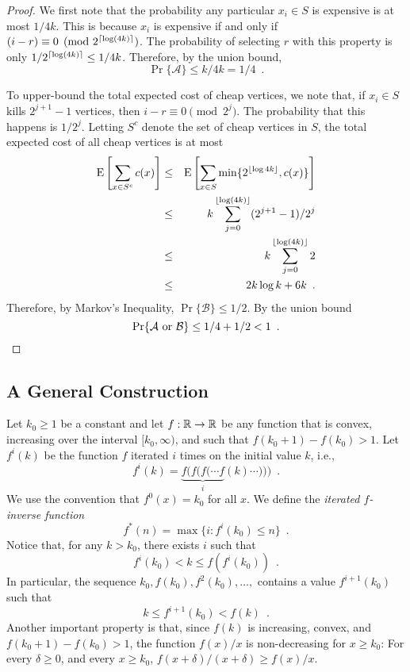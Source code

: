 \documentclass{patmorin}
\begin{document}
\begin{proof}
  We first note that the probability any particular $x_i\in S$ is
  expensive is at most $1/4k$.  This is because $x_i$ is expensive if and
  only if $(i-r)\equiv 0 \pmod {2^{{\lceil \log(4k) \rceil}}}$.  The probability
  of selecting $r$ with this property is only $1/2^{{\lceil \log(4k) \rceil}}
  \le 1/4k$. Therefore, by the union bound,
  \[
     \Pr\{\mathcal{A}\} \le k/4k = 1/4 \enspace .
  \]

  To upper-bound the total expected cost of cheap vertices, we note that,
  if $x_i\in S$ kills $2^{j+1}-1$ vertices, then $i-r\equiv 0\pmod{2^j}$.
  The probability that this happens is $1/2^{j}$. 
  Letting $S^{c}$
  denote the set of cheap vertices in $S$, the total expected cost of
  all cheap vertices is at most
  \begin{eqnarray*}
     \mathrm{E}\left[\sum_{x\in S^{c}}c(x) \right] 
     &\le& \mathrm{E}\left[\sum_{x\in S}\min\{2^{{\lfloor \log 4k \rfloor}},c(x)\} \right]  \\
    &\le&  k\sum_{j=0}^{{\lfloor \log (4k) \rfloor}} (2^{j+1}-1)/2^j \\
     &\le& k\sum_{j=0}^{{\lfloor \log (4k) \rfloor}} 2 \\
     &\le & 2k\log k + 6k \enspace .
  \end{eqnarray*}
  Therefore, by Markov's Inequality, $\Pr\{\mathcal{B}\}\le 1/2$.
  By the union bound
  \[
     \Pr\{\mbox{$\mathcal{A}$ or $\mathcal{B}$}\} \le 1/4+ 1/2 < 1
  \enspace . \qedhere
  \]
\end{proof}

\subsection{A General Construction}

Let $k_0\ge 1$ be a constant and let $f:\mathbb{R}\rightarrow\mathbb{R}$ be any function
that is convex, increasing over the interval $[k_0,\infty)$, and such that
$f(k_0+1)-f(k_0) > 1$.  Let $f^{i}(k)$ be the function $f$ iterated $i$
times on the initial value $k$, i.e.,
\[
   f^{i}(k) = \underbrace{f(f(f(\cdots f}_{i}(k)\cdots))) \enspace .
\]
We use the convention that $f^0(x) = k_0$ for all $x$.  We define the
\emph{iterated $f$-inverse function}
\[
   f^*(n) = \max\{i : f^{i}(k_0) \le n\} \enspace .
\] 
Notice that, for any $k> k_0$, there exists $i$ such that
\[
   f^i(k_0) < k \le f(f^i(k_0)) \enspace .
\]
In particular, the sequence $k_0,f(k_0),f^2(k_0),\ldots,$ contains
a value $f^{i+1}(k_0)$ such that
\[
      k  \le  f^{i+1}(k_0) < f(k) \enspace .
\]
Another important property is that, since $f(k)$ is increasing, convex,
and $f(k_0+1)-f(k_0)>1$, the function $f(x)/x$ is non-decreasing
for $x\ge k_0$: For every $\delta\ge 0$, and every $x\ge k_0$,
$f(x+\delta)/(x+\delta) \ge f(x)/x$.
\end{document}
